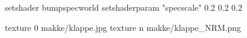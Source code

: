 setshader bumpspecworld
setshaderparam "specscale" 0.2 0.2 0.2

texture 0 makke/klappe.jpg
texture n makke/klappe_NRM.png

